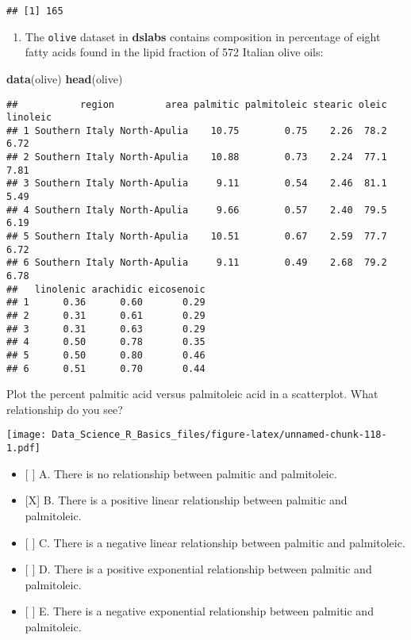 \documentclass[]{article}
\newenvironment{Shaded}{\begin{snugshade}}{\end{snugshade}}
\newcommand{\KeywordTok}[1]{\textcolor[rgb]{0.13,0.29,0.53}{\textbf{#1}}}
\newcommand{\NormalTok}[1]{#1}
\newcommand{\OperatorTok}[1]{\textcolor[rgb]{0.81,0.36,0.00}{\textbf{#1}}}
\providecommand{\tightlist}{%
  \setlength{\itemsep}{0pt}\setlength{\parskip}{0pt}}
\begin{document}
\begin{verbatim}
## [1] 165
\end{verbatim}

\begin{enumerate}
\def\labelenumi{\arabic{enumi}.}
\setcounter{enumi}{7}
\tightlist
\item
  The \texttt{olive} dataset in \textbf{dslabs} contains composition in
  percentage of eight fatty acids found in the lipid fraction of 572
  Italian olive oils:
\end{enumerate}

\begin{Shaded}
\begin{Highlighting}[]
\KeywordTok{data}\NormalTok{(olive)}
\KeywordTok{head}\NormalTok{(olive)}
\end{Highlighting}
\end{Shaded}

\begin{verbatim}
##           region         area palmitic palmitoleic stearic oleic linoleic
## 1 Southern Italy North-Apulia    10.75        0.75    2.26  78.2     6.72
## 2 Southern Italy North-Apulia    10.88        0.73    2.24  77.1     7.81
## 3 Southern Italy North-Apulia     9.11        0.54    2.46  81.1     5.49
## 4 Southern Italy North-Apulia     9.66        0.57    2.40  79.5     6.19
## 5 Southern Italy North-Apulia    10.51        0.67    2.59  77.7     6.72
## 6 Southern Italy North-Apulia     9.11        0.49    2.68  79.2     6.78
##   linolenic arachidic eicosenoic
## 1      0.36      0.60       0.29
## 2      0.31      0.61       0.29
## 3      0.31      0.63       0.29
## 4      0.50      0.78       0.35
## 5      0.50      0.80       0.46
## 6      0.51      0.70       0.44
\end{verbatim}

Plot the percent palmitic acid versus palmitoleic acid in a scatterplot.
What relationship do you see?

\begin{Shaded}
\end{Shaded}

\texttt{[image: Data\_Science\_R\_Basics\_files/figure-latex/unnamed-chunk-118-1.pdf]}

\begin{itemize}
\tightlist
\item
  {[} {]} A. There is no relationship between palmitic and palmitoleic.
\item
  {[}X{]} B. There is a positive linear relationship between palmitic
  and palmitoleic.
\item
  {[} {]} C. There is a negative linear relationship between palmitic
  and palmitoleic.
\item
  {[} {]} D. There is a positive exponential relationship between
  palmitic and palmitoleic.
\item
  {[} {]} E. There is a negative exponential relationship between
  palmitic and palmitoleic.
\end{itemize}
\end{document}
